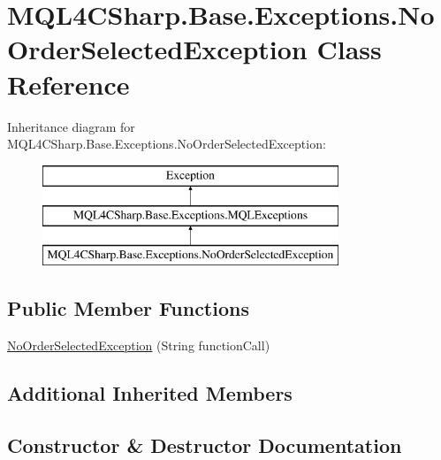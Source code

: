 \hypertarget{class_m_q_l4_c_sharp_1_1_base_1_1_exceptions_1_1_no_order_selected_exception}{}\section{M\+Q\+L4\+C\+Sharp.\+Base.\+Exceptions.\+No\+Order\+Selected\+Exception Class Reference}
\label{class_m_q_l4_c_sharp_1_1_base_1_1_exceptions_1_1_no_order_selected_exception}
Inheritance diagram for M\+Q\+L4\+C\+Sharp.\+Base.\+Exceptions.\+No\+Order\+Selected\+Exception\+:\begin{figure}[H]
\begin{center}
\leavevmode
\includegraphics[height=3.000000cm]{class_m_q_l4_c_sharp_1_1_base_1_1_exceptions_1_1_no_order_selected_exception}
\end{center}
\end{figure}
\subsection*{Public Member Functions}
\begin{DoxyCompactItemize}
\item 
\hyperlink{class_m_q_l4_c_sharp_1_1_base_1_1_exceptions_1_1_no_order_selected_exception_a06739e57fbbe987b2089d147c6113b39}{No\+Order\+Selected\+Exception} (String function\+Call)
\end{DoxyCompactItemize}
\subsection*{Additional Inherited Members}


\subsection{Constructor \& Destructor Documentation}
